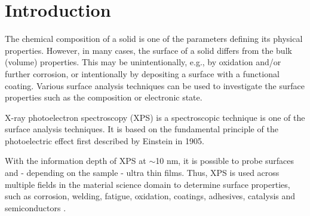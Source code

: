 



\chapter{Introduction} %
\label{Chapter1} %


\newcommand{\keyword}[1]{\textbf{#1}}
\newcommand{\tabhead}[1]{\textbf{#1}}
\newcommand{\code}[1]{\texttt{#1}}
\newcommand{\file}[1]{\texttt{\bfseries#1}}
\newcommand{\option}[1]{\texttt{\itshape#1}}





The chemical composition of a solid is one of the parameters defining its physical properties. However, in many cases, the surface of a solid differs from the bulk (volume) properties. This may be unintentionally, e.g., by oxidation and/or further corrosion, or intentionally by depositing a surface with a functional coating. 
Various surface analysis techniques can be used to investigate the surface properties such as the composition or electronic state.


X-ray photoelectron spectroscopy (XPS) is a spectroscopic technique is one of the surface analysis techniques. It is based on the fundamental principle of the photoelectric effect first described by Einstein \cite{einstein_uber_1905} in 1905. 


With the information depth of XPS at $\sim$10 nm, it is possible to probe surfaces and - depending on the sample - ultra thin films.
Thus, XPS is used across multiple fields in the material science domain to determine surface properties, such as corrosion, welding, fatigue, oxidation, coatings, adhesives, catalysis and semiconductors \cite{noauthor_x-ray_nodate}.



